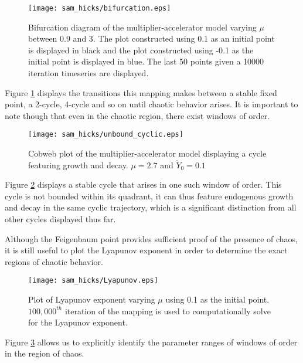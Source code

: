 \begin{figure}
    \centering
    \texttt{[image: sam\_hicks/bifurcation.eps]}
    \caption{Bifurcation diagram of the multiplier-accelerator model varying $\mu$ between 0.9 and 3. The plot constructed using 0.1 as an initial point is displayed in black and the plot constructed using -0.1 as the initial point is displayed in blue. The last 50 points given a 10000 iteration timeseries are displayed.}
    \label{mult_bifurcation}
\end{figure}
Figure \ref{mult_bifurcation} displays the transitions this mapping makes between a stable fixed point, a 2-cycle, 4-cycle and so on until chaotic behavior arises. It is important to note though that even in the chaotic region, there exist windows of order. 
\begin{figure}
    \centering
    \texttt{[image: sam\_hicks/unbound\_cyclic.eps]}
    \caption{Cobweb plot of the multiplier-accelerator model displaying a cycle featuring growth and decay. $\mu=2.7$ and $\dot Y_0=0.1$}
    \label{mult_unbound-cycle}
\end{figure}
Figure \ref{mult_unbound-cycle} displays a stable cycle that arises in one such window of order. This cycle is not bounded within its quadrant, it can thus feature endogenous growth and decay in the same cyclic trajectory, which is a significant distinction from all other cycles displayed thus far. 

Although the Feigenbaum point provides sufficient proof of the presence of chaos, it is still useful to plot the Lyapunov exponent in order to determine the exact regions of chaotic behavior.
\begin{figure}
    \centering
    \texttt{[image: sam\_hicks/Lyapunov.eps]}
    \caption{Plot of Lyapunov exponent varying $\mu$ using 0.1 as the initial point. $100,000^{th}$ iteration of the mapping is used to computationally solve for the Lyapunov exponent. }
    \label{mult_Lyapunov}
\end{figure}
Figure \ref{mult_Lyapunov} allows us to explicitly identify the parameter ranges of windows of order in the region of chaos. 